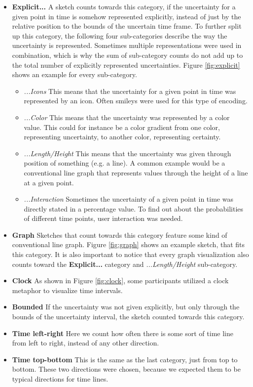 \begin{itemize}
	\item \textbf{Explicit...} A sketch counts towards this category, if the uncertainty for a given point in time is somehow represented explicitly, instead of just by the relative position to the bounds of the uncertain time frame. To further split up this category, the following four sub-categories describe the way the uncertainty is represented. Sometimes multiple representations were used in combination, which is why the sum of sub-category counts do not add up to the total number of explicitly represented uncertainties. Figure \ref{fig:explicit} shows an example for every sub-category.
	\begin{itemize}
		\item \textit{...Icons} This means that the uncertainty for a given point in time was represented by an icon. Often smileys were used for this type of encoding.
		\item \textit{...Color} This means that the uncertainty was represented by a color value. This could for instance be a color gradient from one color, representing uncertainty, to another color, representing certainty. 
		\item \textit{...Length/Height} This means that the uncertainty was given through position of something (e.g. a line). A common example would be a conventional line graph that represents values through the height of a line at a given point.
		\item \textit{...Interaction} Sometimes the uncertainty of a given point in time was directly stated in a percentage value. To find out about the probabilities of different time points, user interaction was needed.
		
			
	\end{itemize}
	
	\item \textbf{Graph} Sketches that count towards this category feature some kind of conventional line graph. Figure \ref{fig:graph} shows an example sketch, that fits this category. It is also important to notice that every graph visualization also counts toward the \textbf{Explicit...} category and \textit{...Length/Height} sub-category.
	
	\item \textbf{Clock} As shown in Figure \ref{fig:clock}, some participants utilized a clock metaphor to visualize time intervals.
	
	\item \textbf{Bounded} If the uncertainty was not given explicitly, but only through the bounds of the uncertainty interval, the sketch counted towards this category.
	\item \textbf{Time left-right} Here we count how often there is some sort of time line from left to right, instead of any other direction.
	\item \textbf{Time top-bottom} This is the same as the last category, just from top to bottom. These two directions were chosen, because we expected them to be typical directions for time lines.
	

\end{itemize}
